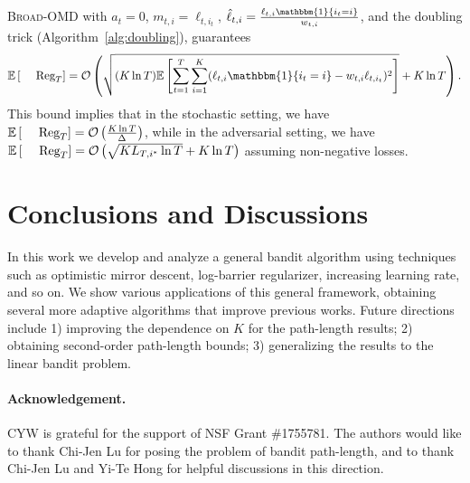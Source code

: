 \documentclass[final, 12pt]{colt2018} %
\newcommand\norm[1]{\left\lVert#1\right\rVert}
\newcommand{\reg}{\text{\rm Reg}}
\begin{document}

\begin{theorem}
\label{thm:best of both}
\textsc{Broad-OMD} with $a_t = 0$, $m_{t,i}=\ell_{t,i_t}$, $\hat{\ell}_{t,i}=\frac{\ell_{t,i}\mathbbm{1}\{i_t=i\}}{w_{t,i}}$, and
the doubling trick (Algorithm~\ref{alg:doubling}), guarantees 
\begin{equation}\label{eqn:new_excess_loss_bound}
\mathbb{E}\left[\reg_T\right]=\mathcal{O}\left(\sqrt{(K\ln T)\mathbb{E}\left[ \sum_{t=1}^T\sum_{i=1}^K (\ell_{t,i}\mathbbm{1}\{i_t=i\}-w_{t,i}\ell_{t,i_t})^2 \right]} + K\ln T \right).
\end{equation}
This bound implies that in the stochastic setting, we have $\mathbb{E}\left[\reg_T\right] = \mathcal{O}\left(\frac{K\ln T}{\Delta}\right)$, while in the adversarial setting, we have 
$\mathbb{E}\left[\reg_T\right] = \mathcal{O}\left(\sqrt{KL_{T,i^*}\ln T}+K\ln T\right)$ assuming non-negative losses.

\end{theorem}

\section{Conclusions and Discussions}
In this work we develop and analyze a general bandit algorithm using techniques such as optimistic mirror descent, log-barrier regularizer, increasing learning rate, and so on.
We show various applications of this general framework, obtaining several more adaptive algorithms that improve previous works.
Future directions include 1) improving the dependence on $K$ for the path-length results; 2) obtaining second-order path-length bounds;
3) generalizing the results to the linear bandit problem.

\paragraph{Acknowledgement.}
CYW is grateful for the support of NSF Grant \#1755781. The authors would like to thank Chi-Jen Lu for posing the problem of bandit path-length, and to thank Chi-Jen Lu and Yi-Te Hong for helpful discussions in this direction. 

 

\end{document}
